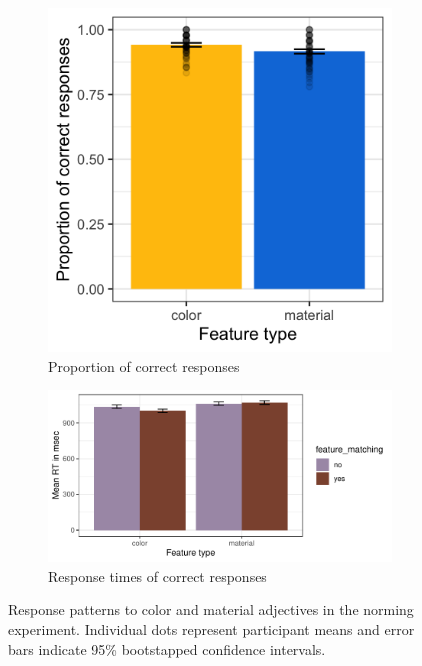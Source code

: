 \documentclass[12pt,letterpaper]{article}
\begin{document}
\begin{figure}[ht]
\centering
\begin{subfigure}{.4\textwidth}
\centering
\includegraphics[width=\textwidth]{plots/exp1_proportion.png}
\caption{Proportion of correct responses}
\label{fig:exp1_a}
\end{subfigure} \hspace{9mm}
\begin{subfigure}{.4 \textwidth}
\centering
\includegraphics[width=\textwidth]{plots/exp1_rt.png}
\caption{Response times of correct responses}
\label{fig:exp1_b}
\end{subfigure}
\caption{Response patterns to color and material adjectives in the norming experiment. Individual dots represent participant means and error bars indicate 95\% bootstapped confidence intervals.}
\label{fig:exp1}
\end{figure}  
\end{document}
